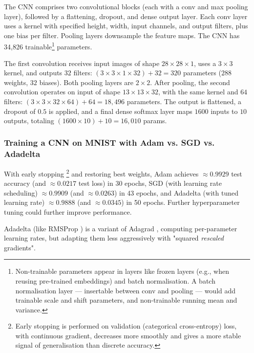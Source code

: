 The CNN comprises two convolutional blocks (each with a conv and max pooling layer),
followed by a flattening, dropout, and dense output layer.
Each conv layer uses a kernel with specified height, width, input channels, and output filters, plus one bias per filter.
Pooling layers downsample the feature maps.
The CNN has 34,826 trainable\footnote{
    Non-trainable parameters appear in layers like frozen layers (e.g., when reusing pre-trained embeddings)
    and batch normalisation.
    A batch normalisation layer — insertable between conv and pooling —
    would add trainable scale and shift parameters, and non-trainable running mean and variance.
} parameters.

The first convolution receives input images of shape $28 \times 28 \times 1$, uses a $3 \times 3$ kernel, and outputs $32$ filters: $(3 \times 3 \times 1 \times 32) + 32 = 320$ parameters ($288$ weights, $32$ biases).
Both pooling layers are $2 \times 2$.
After pooling, the second convolution operates on input of shape $13 \times 13 \times 32$, with the same kernel and $64$ filters: $(3 \times 3 \times 32 \times 64) + 64 = 18,\!496$ parameters.
The output is flattened, a dropout of $0.5$ is applied, and a final dense softmax layer maps $1600$ inputs to $10$ outputs, totaling $(1600 \times 10) + 10 = 16,\!010$ params.
\citep{dumoulin2018guideconvolutionarithmeticdeep,zhang2023d2l}

\subsubsection{Training a CNN on MNIST with Adam vs. SGD vs. Adadelta}

With early stopping \footnote{
    Early stopping is performed on validation (categorical cross-entropy) loss, with continuous gradient,
    decreases more smoothly and gives a more stable signal of generalisation than discrete accuracy.
} and restoring best weights,
Adam achieves $\approx 0.9929$ test accuracy (and $\approx 0.0217$ test loss) in 30 epochs,
SGD (with learning rate scheduling) $\approx 0.9909$ (and $\approx 0.0263$) in 43 epochs, and
Adadelta (with tuned learning rate) $\approx 0.9888$ (and $\approx 0.0345$) in 50 epochs.
Further hyperparameter tuning could further improve performance.

Adadelta \citep{zeiler2012adadeltaadaptivelearningrate} (like RMSProp \citep{hinton2012rmsprop}) is a variant of Adagrad \citep{duchi2011adaptive},
computing per-parameter learning rates,
but adapting them less aggressively with "squared \textit{rescaled} gradients". \citep{zhang2023d2l}

